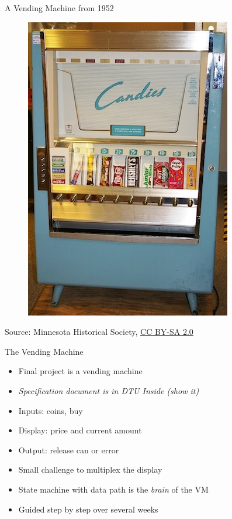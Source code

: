 \begin{frame}[fragile]{A Vending Machine from 1952}
\begin{figure}
    \centering
    \href{https://en.wikipedia.org/wiki/File:CandiesVendingMachine1952.jpg}{\includegraphics[scale=0.4]{CandiesVendingMachine1952}}

\end{figure}

{\tiny Source: Minnesota Historical Society, \href{https://creativecommons.org/licenses/by-sa/2.0}{CC BY-SA 2.0}}
\end{frame}

\begin{frame}[fragile]{The Vending Machine}
\begin{itemize}
\item Final project is a vending machine
\item \emph{Specification document is in DTU Inside (show it)}
\item Inputs: coins, buy
\item Display: price and current amount
\item Output: release can or error
\item Small challenge to multiplex the display
\item State machine with data path is the \emph{brain} of the VM
\item Guided step by step over several weeks
\end{itemize}
\end{frame}

